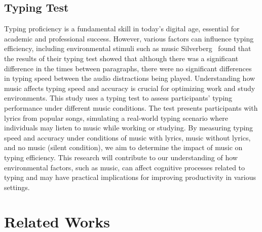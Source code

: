 \documentclass[manuscript, screen, review]{acmart} %
\begin{document}
\subsection{Typing Test}
Typing proficiency is a fundamental skill in today's digital age, essential for academic and professional success. 
However, various factors can influence typing efficiency, including environmental stimuli such as music Silverberg~\cite{AudioDistractionsAshley} found that the results of their typing test showed that although there was a significant difference in the times between paragraphs, there were no significant differences in typing speed between the audio distractions being played. 
Understanding how music affects typing speed and accuracy is crucial for optimizing work and study environments.
This study uses a typing test to assess participants' typing performance under different music conditions. 
The test presents participants with lyrics from popular songs, simulating a real-world typing scenario where individuals may listen to music while working or studying.
By measuring typing speed and accuracy under conditions of music with lyrics, music without lyrics, and no music (silent condition), we aim to determine the impact of music on typing efficiency. 
This research will contribute to our understanding of how environmental factors, such as music, can affect cognitive processes related to typing and may have practical implications for improving productivity in various settings.

\section{Related Works}
\end{document}
